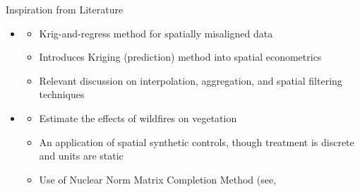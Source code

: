 \begin{frame}{Inspiration from Literature}

\begin{itemize}
    \item \cite{pouliot2022}
      \begin{itemize}
        \item Krig-and-regress method for spatially misaligned data
        \item Introduces Kriging (prediction) method into spatial econometrics
        \item Relevant discussion on interpolation, aggregation, and spatial filtering techniques
      \end{itemize}
    \vspace{-7pt}
    \item \cite{serraburieletal2020}
      \begin{itemize}
        \item Estimate the effects of wildfires on vegetation
        \item An application of spatial synthetic controls, though treatment is discrete and units are static
        \item Use of Nuclear Norm Matrix Completion Method (see, \cite{athey2021}
      \end{itemize}
  \end{itemize}
\end{frame}